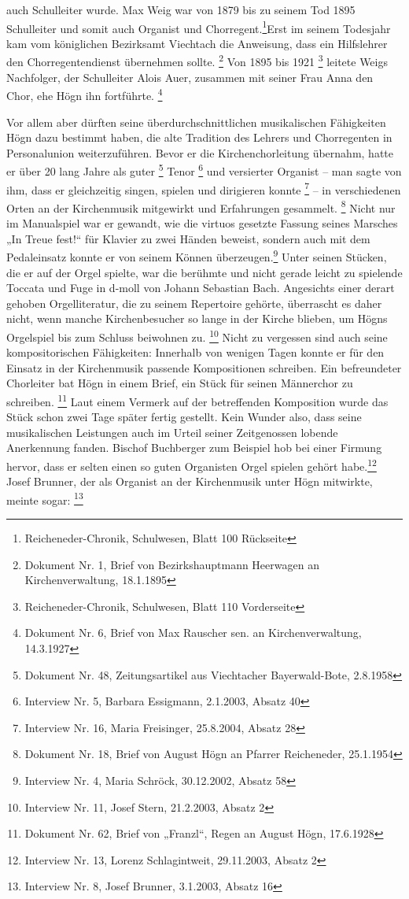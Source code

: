 auch Schulleiter wurde. Max Weig war von 1879 bis zu seinem Tod 1895
Schulleiter und somit auch Organist und Chorregent.\footnote{
Reicheneder-Chronik, Schulwesen, Blatt 100
Rückseite}Erst im seinem Todesjahr kam vom
königlichen Bezirksamt Viechtach die Anweisung, dass ein Hilfslehrer
den Chorregentendienst übernehmen sollte. \footnote{Dokument Nr. 1,
Brief von Bezirkshauptmann Heerwagen an Kirchenverwaltung, 18.1.1895}
Von 1895 bis 1921 \footnote{Reicheneder-Chronik, Schulwesen, Blatt 110
Vorderseite} leitete Weigs Nachfolger, der Schulleiter Alois Auer,
zusammen mit seiner Frau Anna den Chor, ehe Högn ihn
fortführte. \footnote{Dokument Nr. 6, Brief von Max Rauscher sen. an
Kirchenverwaltung, 14.3.1927}

Vor allem aber dürften seine überdurchschnittlichen musikalischen
Fähigkeiten Högn dazu bestimmt haben, die alte Tradition des Lehrers
und Chorregenten in Personalunion weiterzuführen. Bevor er die
Kirchenchorleitung übernahm, hatte er über 20 lang Jahre als
guter \footnote{Dokument Nr. 48, Zeitungsartikel aus Viechtacher
Bayerwald-Bote, 2.8.1958} Tenor \footnote{Interview Nr. 5, Barbara
Essigmann, 2.1.2003, Absatz 40} und versierter Organist – man sagte von
ihm, dass er gleichzeitig singen, spielen und dirigieren
konnte \footnote{Interview Nr. 16, Maria Freisinger, 25.8.2004, Absatz
28} – in verschiedenen Orten an der Kirchenmusik mitgewirkt und
Erfahrungen gesammelt. \footnote{Dokument Nr. 18, Brief von August Högn
an Pfarrer Reicheneder, 25.1.1954} Nicht nur im Manualspiel war er
gewandt, wie die virtuos gesetzte Fassung seines Marsches „In Treue
fest!“ für Klavier zu zwei Händen beweist, sondern auch mit dem
Pedaleinsatz konnte er von seinem Können überzeugen.\footnote{
Interview Nr. 4, Maria Schröck, 30.12.2002, Absatz 58} Unter seinen
Stücken, die er auf der Orgel spielte, war die berühmte und nicht
gerade leicht zu spielende Toccata und Fuge in d-moll von Johann
Sebastian Bach. Angesichts einer derart gehoben Orgelliteratur, die zu
seinem Repertoire gehörte, überrascht es daher nicht, wenn manche
Kirchenbesucher so lange in der Kirche blieben, um Högns Orgelspiel bis
zum Schluss beiwohnen zu. \footnote{Interview Nr. 11, Josef Stern,
21.2.2003, Absatz 2} Nicht zu vergessen sind auch seine
kompositorischen Fähigkeiten: Innerhalb von wenigen Tagen konnte er für
den Einsatz in der Kirchenmusik passende Kompositionen schreiben. Ein
befreundeter Chorleiter bat Högn in einem Brief, ein Stück für seinen
Männerchor zu schreiben. \footnote{Dokument Nr. 62, Brief von „Franzl“,
Regen an August Högn, 17.6.1928} Laut einem Vermerk auf der
betreffenden Komposition wurde das Stück schon zwei Tage später fertig
gestellt. Kein Wunder also, dass seine musikalischen Leistungen auch im
Urteil seiner Zeitgenossen lobende Anerkennung fanden. Bischof
Buchberger zum Beispiel hob bei einer Firmung hervor, dass er selten
einen so guten Organisten Orgel spielen gehört habe.\footnote{
Interview Nr. 13, Lorenz Schlagintweit, 29.11.2003, Absatz 2} Josef
Brunner, der als Organist an der Kirchenmusik unter Högn mitwirkte,
meinte sogar:  \footnote{Interview Nr. 8, Josef
Brunner, 3.1.2003, Absatz 16}

